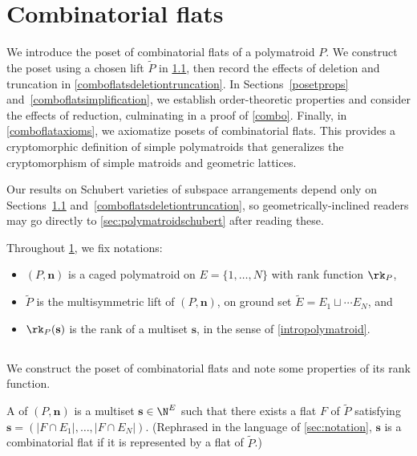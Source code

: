 \section{Combinatorial flats}\label{comboflats}
We introduce the poset of combinatorial flats of a polymatroid $P$.
We construct the poset using a chosen lift $\widetilde P$ in \cref{comboflatsminimum}, then record the effects of deletion and truncation in \cref{comboflatsdeletiontruncation}.
In Sections~\ref{posetprops} and~\ref{comboflatsimplification}, we establish order-theoretic properties and consider the effects of reduction, culminating in a proof of \cref{combo}.
Finally, in \cref{comboflataxioms}, we axiomatize posets of combinatorial flats. This provides a cryptomorphic definition of simple polymatroids that generalizes the cryptomorphism of simple matroids and geometric lattices.

Our results on Schubert varieties of subspace arrangements depend only on Sections~\ref{comboflatsminimum} and~\ref{comboflatsdeletiontruncation}, so geometrically-inclined readers may go directly to \cref{sec:polymatroidschubert} after reading these.

Throughout \cref{comboflats}, we fix notations:
\begin{itemize}
\item $(P, \mathbf n)$ is a caged polymatroid on $E = \{1, \ldots, N\}$ with rank function $\rk_P$,
\item $\widetilde P$ is the multisymmetric lift of $(P, \mathbf n)$, on ground set $\widetilde E = E_1 \sqcup \cdots E_N$, and
\item $\rk_P(\mathbf s)$ is the rank of a multiset $\mathbf s$, in the sense of \cref{intropolymatroid}.
\end{itemize}


\subsection{} \label{comboflatsminimum} We construct the poset of combinatorial flats and note some properties of its rank function.
\begin{defi}\label{defnCombFlat}
    A  of $(P, \mathbf n)$ is a multiset $\mathbf s \in \N^E$ such that there exists a flat $F$ of $\widetilde P$ satisfying $\mathbf s = (|F \cap E_1|, \ldots, |F \cap E_N|)$.
    (Rephrased in the language of \cref{sec:notation}, $\mathbf s$ is a combinatorial flat if it is represented by a flat of $\widetilde P$.)
\end{defi}

